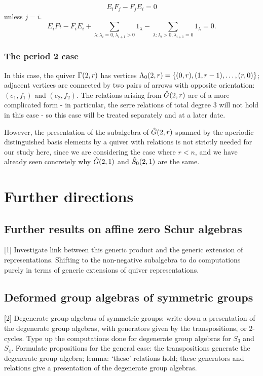 \documentclass[a4paper, 11pt]{report}
\begin{document}
{\begin{lemma}
\begin{equation*}
E_iF_j - F_jE_i = 0
\end{equation*}
unless $j=i$.
\begin{equation*}
E_iFi - F_iE_i + \sum_{\lambda:\lambda_i = 0,\lambda_{i+1}>0} 1_\lambda - \sum_{\lambda:\lambda_i>0, \lambda_{i+1}=0} 1_\lambda = 0.
\end{equation*}
\end{lemma}

\subsection{The period 2 case}

In this case, the quiver $\presentationquiver[2,r]$ has vertices $\compositions[(2,r)]=\{(0,r), (1,r-1),\ldots, (r,0)\}$; adjacent vertices are connected by two pairs of arrows with opposite orientation: $(e_1,f_1)$ and $(e_2,f_2)$. The relations arising from $\generic[2,r]$ are of a more complicated form - in particular, the serre relations of total degree $3$ will not hold in this case - so this case will be treated separately and at a later date.

However, the presentation of the subalgebra of $\generic[2,r]$ spanned by the aperiodic distinguished basis elements by a quiver with relations is not strictly needed for our study here, since we are considering the case where $r<n$, and we have already seen concretely why $\generic[2,1]$ and $\zeroschur[2,1]$ are the same.
}


\chapter{Further directions}

\section{Further results on affine zero Schur algebras}

[1] Investigate link between this generic product and the generic extension of representations. Shifting to the non-negative subalgebra to do computations purely in terms of generic extensions of quiver representations.

\section{Deformed group algebras of symmetric groups}

[2] Degenerate group algebras of symmetric groups: write down a presentation of the degenerate group algebras, with generators given by the transpositions, or $2$-cycles. Type up the computations done for degenerate group algebras for $S_3$ and $S_4$. Formulate propositions for the general case: the transpositions generate the degenerate group algebra; lemma: `these' relations hold; these generators and relations give a presentation of the degenerate group algebras.
\end{document}
